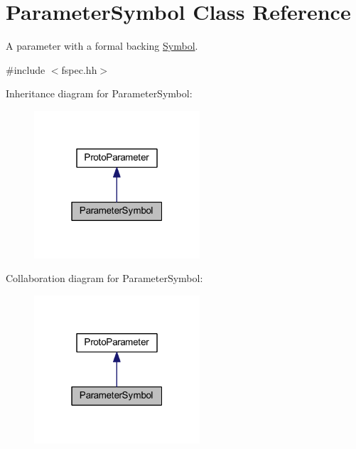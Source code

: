 \hypertarget{class_parameter_symbol}{}\section{Parameter\+Symbol Class Reference}
\label{class_parameter_symbol}


A parameter with a formal backing \mbox{\hyperlink{class_symbol}{Symbol}}.  




{\ttfamily \#include $<$fspec.\+hh$>$}



Inheritance diagram for Parameter\+Symbol\+:
\nopagebreak
\begin{figure}[H]
\begin{center}
\leavevmode
\includegraphics[width=175pt]{class_parameter_symbol__inherit__graph}
\end{center}
\end{figure}


Collaboration diagram for Parameter\+Symbol\+:
\nopagebreak
\begin{figure}[H]
\begin{center}
\leavevmode
\includegraphics[width=175pt]{class_parameter_symbol__coll__graph}
\end{center}
\end{figure}
